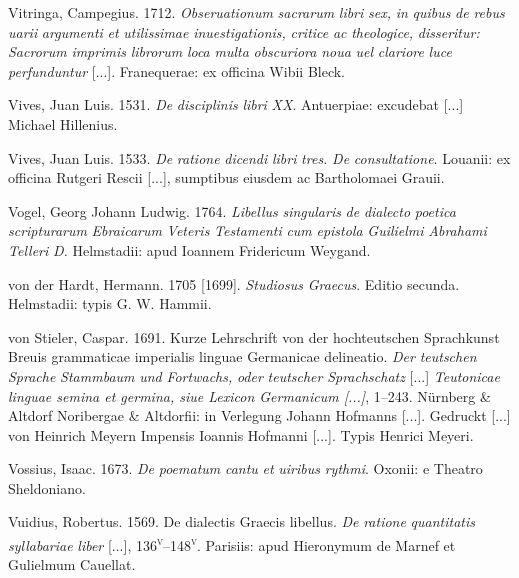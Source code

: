 Vitringa, Campegius. 1712. \textit{Obseruationum} \textit{sacrarum} \textit{libri} \textit{sex,} \textit{in} \textit{quibus} \textit{de} \textit{rebus} \textit{uarii} \textit{argumenti} \textit{et} \textit{utilissimae} \textit{inuestigationis,} \textit{critice} \textit{ac} \textit{theologice,} \textit{disseritur:} \textit{Sacrorum} \textit{imprimis} \textit{librorum} \textit{loca} \textit{multa} \textit{obscuriora} \textit{noua} \textit{uel} \textit{clariore} \textit{luce} \textit{perfunduntur} [...]. Franequerae: ex officina Wibii Bleck.

Vives, Juan Luis. 1531. \textit{De} \textit{disciplinis} \textit{libri} \textit{XX}. Antuerpiae: excudebat [...] Michael Hillenius.

Vives, Juan Luis. 1533. \textit{De} \textit{ratione} \textit{dicendi} \textit{libri} \textit{tres.} \textit{De} \textit{consultatione}. Louanii: ex officina Rutgeri Rescii [...], sumptibus eiusdem ac Bartholomaei Grauii.

Vogel, Georg Johann Ludwig. 1764. \textit{Libellus} \textit{singularis} \textit{de} \textit{dialecto} \textit{poetica} \textit{scripturarum} \textit{Ebraicarum} \textit{Veteris} \textit{Testamenti} \textit{cum} \textit{epistola} \textit{Guilielmi} \textit{Abrahami} \textit{Telleri} \textit{D.} Helmstadii: apud Ioannem Fridericum Weygand.

von der Hardt, Hermann. 1705 [1699]. \textit{Studiosus} \textit{Graecus}. Editio secunda. Helmstadii: typis G. W. Hammii.

von Stieler, Caspar. 1691. Kurze Lehrschrift von der hochteutschen Sprachkunst {\textbar} Breuis grammaticae imperialis linguae Germanicae delineatio. \textit{Der} \textit{teutschen} \textit{Sprache} \textit{Stammbaum} \textit{und} \textit{Fortwachs,} \textit{oder} \textit{teutscher} \textit{Sprachschatz} [...] \textit{{\textbar} Teutonicae linguae semina et germina, siue Lexicon Germanicum [...]}, 1–243. Nürnberg \& Altdorf {\textbar} Noribergae \& Altdorfii: in Verlegung Johann Hofmanns [...]. Gedruckt [...] von Heinrich Meyern {\textbar} Impensis Ioannis Hofmanni [...]. Typis Henrici Meyeri.

Vossius, Isaac. 1673. \textit{De} \textit{poematum} \textit{cantu} \textit{et} \textit{uiribus} \textit{rythmi}. Oxonii: e Theatro Sheldoniano.

Vuidius, Robertus. 1569. De dialectis Graecis libellus. \textit{De} \textit{ratione} \textit{quantitatis} \textit{syllabariae} \textit{liber} [...], 136\textsc{\textsuperscript{v}}–148\textsc{\textsuperscript{v}}. Parisiis: apud Hieronymum de Marnef et Gulielmum Cauellat.

